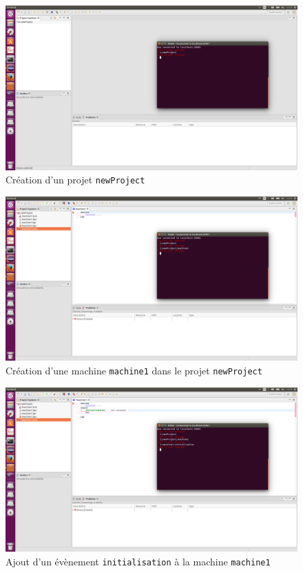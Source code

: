 \begin{figure}[H]
    \centering
    \includegraphics{pictures/rodinCommunication2.png}
    \caption{Création d'un projet \texttt{newProject}}
    \label{fig:rodinCommunication2}
\end{figure}

\begin{figure}[H]
    \centering
    \includegraphics{pictures/rodinCommunication3.png}
    \caption{Création d'une machine \texttt{machine1} dans le projet \texttt{newProject}}
    \label{fig:rodinCommunication3}
\end{figure}

\begin{figure}[H]
    \centering
    \includegraphics{pictures/rodinCommunication4.png}
    \caption{Ajout d'un évènement \texttt{initialisation} à la machine \texttt{machine1}}
    \label{fig:rodinCommunication4}
\end{figure}

